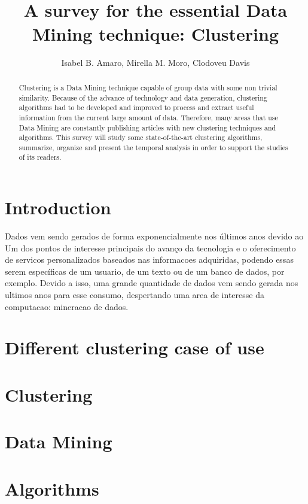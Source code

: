 \documentclass[12pt]{article}
\title{\\ A survey for the essential Data Mining technique: Clustering}
\author{Isabel B. Amaro\inst{1}, Mirella M. Moro\inst{2}, Clodoveu Davis\inst{3}}
\begin{document}
 

\maketitle

\begin{abstract}
Clustering is a Data Mining technique capable of group data with some non trivial similarity. Because of the advance of technology and data generation, clustering algorithms had to be developed and improved to process and extract useful information from the current large amount of data. Therefore, many areas that use Data Mining are constantly publishing articles with new clustering techniques and algorithms. This survey will study some state-of-the-art clustering algorithms, summarize, organize and present the temporal analysis in order to support the studies of its readers.
\end{abstract}

\section{Introduction}
Dados vem sendo gerados de forma exponencialmente nos últimos anos devido ao
Um dos pontos de interesse principais do avanço da tecnologia e o oferecimento de servicos personalizados baseados nas informacoes adquiridas, podendo essas serem específicas de um usuario, de um texto ou de um banco de dados, por exemplo. Devido a isso, uma grande quantidade de dados vem sendo gerada nos ultimos anos para esse consumo, despertando uma area de interesse da computacao: mineracao de dados.

\section{Different clustering case of use}

\section{Clustering}

\section{Data Mining}

\section{Algorithms}
\end{document}
